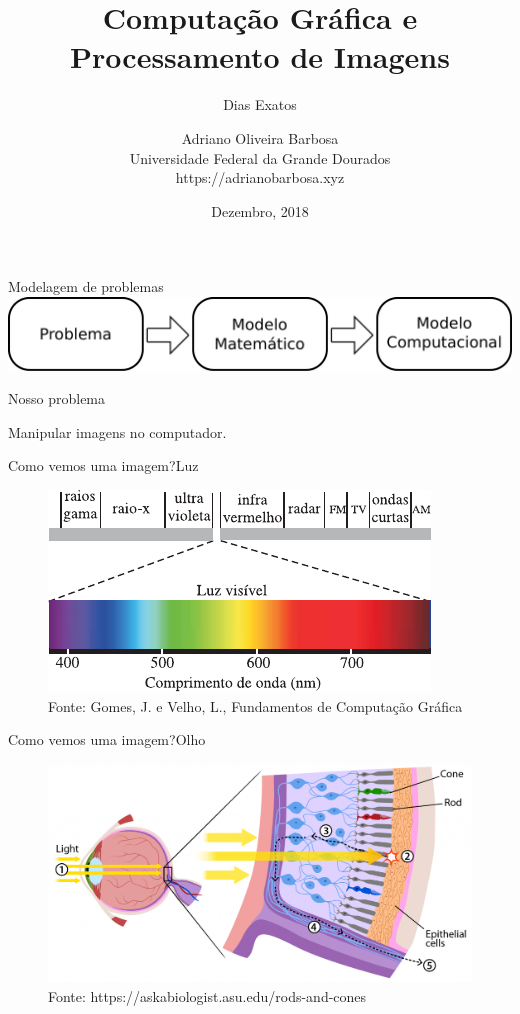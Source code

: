 \documentclass{beamer}
\author[Adriano Barbosa]{Adriano Oliveira Barbosa\\
Universidade Federal da Grande Dourados\\
https://adrianobarbosa.xyz}
\title{Computa\c{c}\~ao Gr\'afica e Processamento de Imagens}
\subtitle[Dias Exatos]{Dias Exatos}
\date{Dezembro, 2018}
\begin{document}
\begin{frame}
	\maketitle
\end{frame}

\begin{frame}{Modelagem de problemas}
    \includegraphics[width=\textwidth]{figs/paradigmas.pdf}
\end{frame}

\begin{frame}{Nosso problema}
    \begin{center}
    Manipular imagens no computador.
    \end{center}
\end{frame}

\begin{frame}{Como vemos uma imagem?}{Luz}
    \begin{figure}
        \centering
        \includegraphics[scale=1.0]{figs/espectro-luz.pdf}
        \caption{Fonte: Gomes, J. e Velho, L., Fundamentos de Computa\c{c}\~ao
        Gr\'afica}
    \end{figure}
\end{frame}

\begin{frame}{Como vemos uma imagem?}{Olho}
    \begin{figure}
        \centering
        \includegraphics[width=\textwidth]{figs/rods-cones.png}
        \caption{Fonte: https://askabiologist.asu.edu/rods-and-cones}
    \end{figure}
\end{frame}
\end{document}
